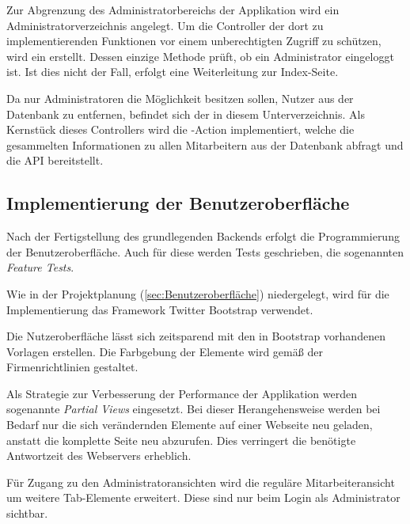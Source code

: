 
Zur Abgrenzung des Administratorbereichs der Applikation wird ein Administratorverzeichnis angelegt.
Um die Controller der dort zu implementierenden Funktionen vor einem unberechtigten Zugriff zu schützen, wird ein
 erstellt. Dessen einzige Methode prüft, ob ein Administrator eingeloggt ist.
Ist dies nicht der Fall, erfolgt eine Weiterleitung zur Index-Seite.

Da nur Administratoren die Möglichkeit besitzen sollen, Nutzer aus der Datenbank zu entfernen,
befindet sich der  in diesem Unterverzeichnis. Als Kernstück dieses
Controllers wird die -Action implementiert, welche die gesammelten Informationen
zu allen Mitarbeitern aus der Datenbank abfragt und die API bereitstellt.


\subsection{Implementierung der Benutzeroberfläche}
\label{sec:Implementierung der Benutzeroberfläche}
Nach der Fertigstellung des grundlegenden Backends erfolgt die Programmierung der Benutzeroberfläche.
Auch für diese werden Tests geschrieben, die sogenannten \textit{Feature Tests}.


Wie in der Projektplanung (\Vgl \ref{sec:Benutzeroberfläche}) niedergelegt, wird für die Implementierung
das Framework Twitter Bootstrap verwendet.

Die Nutzeroberfläche lässt sich zeitsparend mit den in Bootstrap vorhandenen Vorlagen erstellen.
Die Farbgebung der Elemente wird gemäß der Firmenrichtlinien gestaltet.


Als Strategie zur Verbesserung der Performance der Applikation werden sogenannte
\textit{Partial Views} eingesetzt. Bei dieser Herangehensweise werden bei Bedarf nur die sich
verändernden Elemente auf einer Webseite neu geladen, anstatt die komplette Seite neu abzurufen.
Dies verringert die benötigte Antwortzeit des Webservers erheblich.

Für Zugang zu den Administratoransichten wird die reguläre Mitarbeiteransicht um weitere Tab-Elemente
erweitert. Diese sind nur beim Login als Administrator sichtbar.

